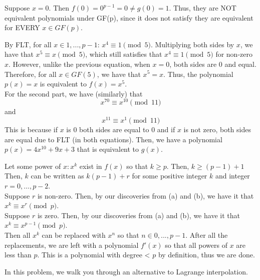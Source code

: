 \documentclass[11pt]{article}
\begin{document}
\begin{solution}\begin{Parts}\Part 
  Suppose $x=0$. Then $f(0)=0^{p-1}=0\neq g(0)=1$.
  Thus, they are NOT equivalent polynomials under GF(p), 
  since it does not satisfy they are equivalent for EVERY $x\in GF(p)$.
  
\Part 
By FLT, for all $x\in{1,...,p-1}$: $x^4\equiv 1\pmod{5}$.
Multiplying both sides by $x$, we have that $x^5\equiv x\pmod{5}$, 
which still satisfies that $x^4\equiv 1\pmod{5}$ for non-zero $x$.
However, unlike the previous equation, when $x=0$, both sides are 0 and equal.
Therefore, for all $x\in GF(5)$, we have that $x^5=x$. 
Thus, the polynomial $p(x)=x$ is equivalent to $f(x)=x^5$.
\\For the second part, we have (similarly) that
$$x^{70}\equiv x^{10}\pmod{11}$$
and
$$x^{11}\equiv x^1\pmod{11}$$
This is because if $x$ is 0 both sides are equal to 0
and if $x$ is not zero, both sides are equal due to FLT (in both equations). 
Then, we have a polynomial $p(x)=4x^{10}+9x+3$ that is equivalent to $g(x)$.

\Part 
Let some power of $x: x^k$ exist in $f(x)$ so that $k\geq p$.
Then, $k\geq(p-1)+1$
Then, $k$ can be written as $k(p-1)+r$ for some positive integer $k$ and integer $r=0,\dots,p-2$.
\\Suppose $r$ is non-zero. 
Then, by our discoveries from (a) and (b), we have it that $x^k\equiv x^r\pmod{p}$.
\\Suppose $r$ is zero. 
Then, by our discoveries from (a) and (b), we have it that $x^k\equiv x^{p-1}\pmod{p}$. 
\\Then all $x^k$ can be replaced with $x^n$ so that $n\in{0,...,p-1}$.
After all the replacements, we are left with a polynomial $f'(x)$ so that all powers of $x$ are less than $p$.
This is a polynomial with degree < $p$ by definition, thus we are done.
\end{Parts}\end{solution}\newpage

In this problem, we walk you through an alternative to Lagrange interpolation.
\end{document}

